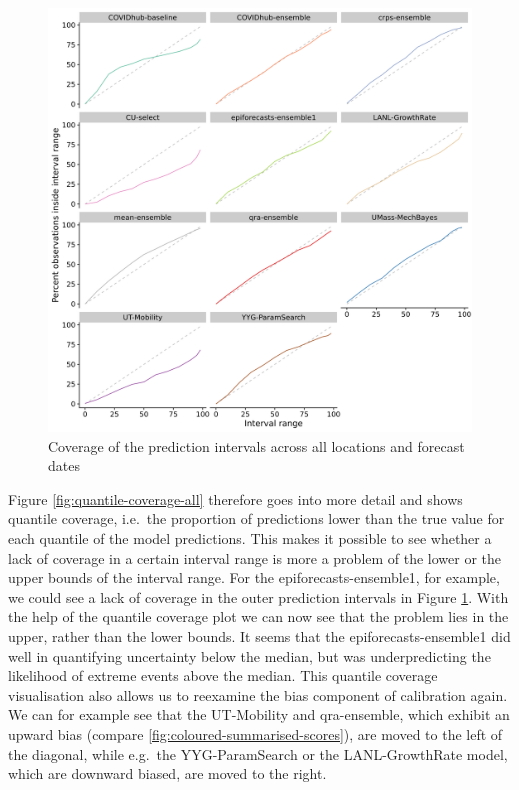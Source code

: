 \documentclass[
]{book}
\begin{document}
\begin{figure}
\includegraphics[width=1\linewidth]{../visualisation/chapter-5-results/interval-coverage-all} \caption{Coverage of the prediction intervals across all locations and forecast dates}\label{fig:interval-coverage-all}
\end{figure}

Figure \ref{fig:quantile-coverage-all} therefore goes into more detail and shows quantile coverage, i.e.~the proportion of predictions lower than the true value for each quantile of the model predictions. This makes it possible to see whether a lack of coverage in a certain interval range is more a problem of the lower or the upper bounds of the interval range. For the epiforecasts-ensemble1, for example, we could see a lack of coverage in the outer prediction intervals in Figure \ref{fig:interval-coverage-all}. With the help of the quantile coverage plot we can now see that the problem lies in the upper, rather than the lower bounds. It seems that the epiforecasts-ensemble1 did well in quantifying uncertainty below the median, but was underpredicting the likelihood of extreme events above the median. This quantile coverage visualisation also allows us to reexamine the bias component of calibration again. We can for example see that the UT-Mobility and qra-ensemble, which exhibit an upward bias (compare \ref{fig:coloured-summarised-scores}), are moved to the left of the diagonal, while e.g.~the YYG-ParamSearch or the LANL-GrowthRate model, which are downward biased, are moved to the right.
\end{document}
